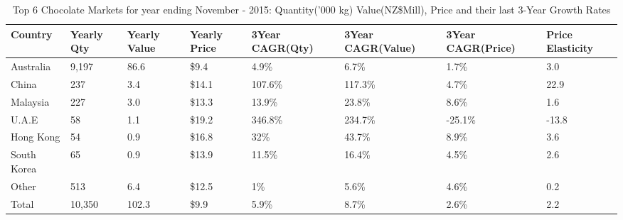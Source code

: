 \begin{table}[ht]
\centering
{\scriptsize
\begin{tabular}[t]{p{1.8cm}>{\hfill}p{1.4cm}>{\hfill}p{1.4cm}>{\hfill}p{1.6cm}>{\hfill}p{1.9cm}>{\hfill}p{2cm}>{\hfill}p{1.9cm}>{\hfill}p{1.5cm}}
 \textbf{Country} & \textbf{Yearly Qty} & \textbf{Yearly Value} & \textbf{Yearly Price} & \textbf{3Year CAGR(Qty)} & \textbf{3Year CAGR(Value)} & \textbf{3Year CAGR(Price)} & \textbf{Price Elasticity} \\
\hline
Australia & 9,197 & 86.6 & \$9.4 & 4.9\% & 6.7\% & 1.7\% & 3.0 \\  
China & 237 & 3.4 & \$14.1 & 107.6\% & 117.3\% & 4.7\% & 22.9 \\  
Malaysia & 227 & 3.0 & \$13.3 & 13.9\% & 23.8\% & 8.6\% & 1.6 \\  
U.A.E & 58 & 1.1 & \$19.2 & 346.8\% & 234.7\% & -25.1\% & -13.8 \\  
Hong Kong & 54 & 0.9 & \$16.8 & 32\% & 43.7\% & 8.9\% & 3.6 \\  
South Korea & 65 & 0.9 & \$13.9 & 11.5\% & 16.4\% & 4.5\% & 2.6 \\  
Other & 513 & 6.4 & \$12.5 & 1\% & 5.6\% & 4.6\% & 0.2 \\  
Total & 10,350 & 102.3 & \$9.9 & 5.9\% & 8.7\% & 2.6\% & 2.2 \\  
\hline
\end{tabular}
}
\caption{\scriptsize Top 6 Chocolate Markets for year ending November - 2015: Quantity('000 kg) Value(NZ\$Mill), Price and their last 3-Year Growth Rates}
\end{table}

